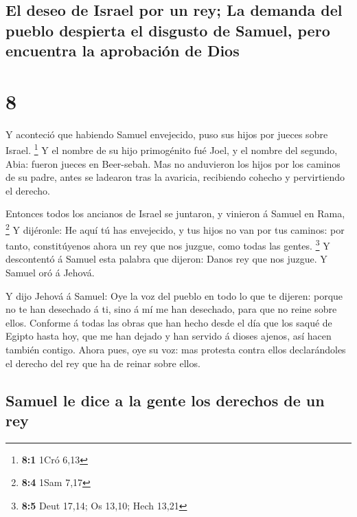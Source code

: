 \hypertarget{el-deseo-de-israel-por-un-rey-la-demanda-del-pueblo-despierta-el-disgusto-de-samuel-pero-encuentra-la-aprobaciuxf3n-de-dios}{%
\subsection{El deseo de Israel por un rey; La demanda del pueblo
despierta el disgusto de Samuel, pero encuentra la aprobación de
Dios}\label{el-deseo-de-israel-por-un-rey-la-demanda-del-pueblo-despierta-el-disgusto-de-samuel-pero-encuentra-la-aprobaciuxf3n-de-dios}}

\hypertarget{section-7}{%
\section{8}\label{section-7}}

 Y aconteció que habiendo Samuel envejecido, puso sus hijos
por jueces sobre Israel. \footnote{\textbf{8:1} 1Cró 6,13} 
Y el nombre de su hijo primogénito fué Joel, y el nombre del segundo,
Abia: fueron jueces en Beer-sebah.  Mas no anduvieron los
hijos por los caminos de su padre, antes se ladearon tras la avaricia,
recibiendo cohecho y pervirtiendo el derecho.

 Entonces todos los ancianos de Israel se juntaron, y
vinieron á Samuel en Rama, \footnote{\textbf{8:4} 1Sam 7,17}
 Y dijéronle: He aquí tú has envejecido, y tus hijos no van
por tus caminos: por tanto, constitúyenos ahora un rey que nos juzgue,
como todas las gentes. \footnote{\textbf{8:5} Deut 17,14; Os 13,10; Hech
  13,21}  Y descontentó á Samuel esta palabra que dijeron:
Danos rey que nos juzgue. Y Samuel oró á Jehová.

 Y dijo Jehová á Samuel: Oye la voz del pueblo en todo lo
que te dijeren: porque no te han desechado á ti, sino á mí me han
desechado, para que no reine sobre ellos.  Conforme á todas
las obras que han hecho desde el día que los saqué de Egipto hasta hoy,
que me han dejado y han servido á dioses ajenos, así hacen también
contigo.  Ahora pues, oye su voz: mas protesta contra ellos
declarándoles el derecho del rey que ha de reinar sobre ellos.

\hypertarget{samuel-le-dice-a-la-gente-los-derechos-de-un-rey}{%
\subsection{Samuel le dice a la gente los derechos de un
rey}\label{samuel-le-dice-a-la-gente-los-derechos-de-un-rey}}

